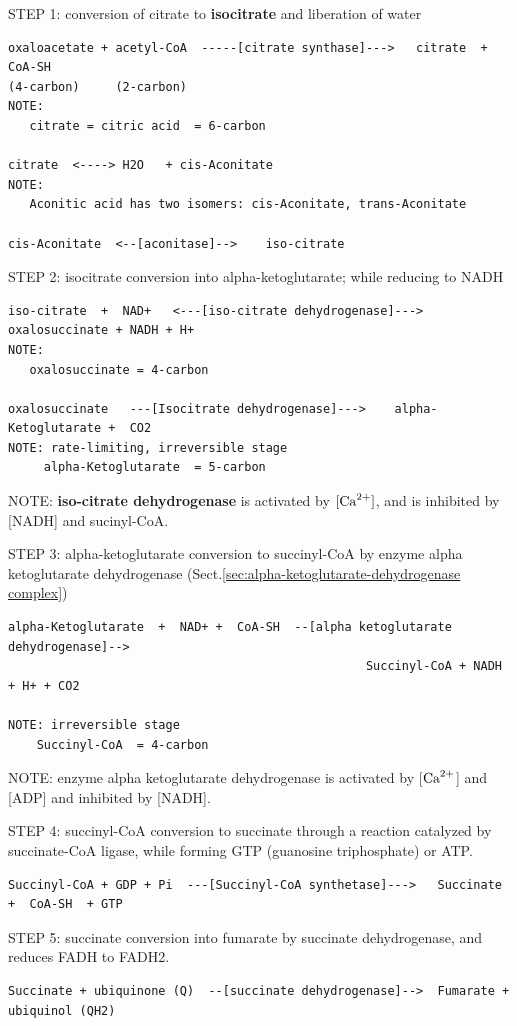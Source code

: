 STEP 1: conversion of citrate to {\bf isocitrate} and liberation of water
{\tiny
\begin{verbatim}
oxaloacetate + acetyl-CoA  -----[citrate synthase]--->   citrate  + CoA-SH
(4-carbon)     (2-carbon)
NOTE:
   citrate = citric acid  = 6-carbon

citrate  <----> H2O   + cis-Aconitate
NOTE:
   Aconitic acid has two isomers: cis-Aconitate, trans-Aconitate

cis-Aconitate  <--[aconitase]-->    iso-citrate
\end{verbatim}
}

\label{sec:alpha-ketoglutarate}
STEP 2: isocitrate conversion into alpha-ketoglutarate; while reducing
 to NADH
{\tiny
\begin{verbatim}
iso-citrate  +  NAD+   <---[iso-citrate dehydrogenase]--->    oxalosuccinate + NADH + H+
NOTE:
   oxalosuccinate = 4-carbon

oxalosuccinate   ---[Isocitrate dehydrogenase]--->    alpha-Ketoglutarate +  CO2
NOTE: rate-limiting, irreversible stage
     alpha-Ketoglutarate  = 5-carbon
\end{verbatim}
}
NOTE: {\bf iso-citrate dehydrogenase} is activated by $[{\text{Ca}^{2+}}]$, and is inhibited
by [NADH] and sucinyl-CoA.

STEP 3: alpha-ketoglutarate conversion to succinyl-CoA by enzyme alpha
ketoglutarate dehydrogenase (Sect.\ref{sec:alpha-ketoglutarate-dehydrogenase complex})
{\tiny
\begin{verbatim}
alpha-Ketoglutarate  +  NAD+ +  CoA-SH  --[alpha ketoglutarate dehydrogenase]-->
                                                  Succinyl-CoA + NADH + H+ + CO2

NOTE: irreversible stage
    Succinyl-CoA  = 4-carbon
\end{verbatim}
}
NOTE: enzyme alpha ketoglutarate dehydrogenase is activated by [${\text{Ca}^{2+}}$] and
[ADP] and inhibited by [NADH].

STEP 4: succinyl-CoA conversion to succinate through a reaction catalyzed by
succinate-CoA ligase, while forming GTP (guanosine triphosphate) or ATP.

{\tiny
\begin{verbatim}
Succinyl-CoA + GDP + Pi  ---[Succinyl-CoA synthetase]--->   Succinate +  CoA-SH  + GTP
\end{verbatim}
}


STEP 5: succinate conversion into fumarate by succinate dehydrogenase, and
reduces FADH to FADH2.

{\tiny
\begin{verbatim}
Succinate + ubiquinone (Q)  --[succinate dehydrogenase]-->  Fumarate + ubiquinol (QH2)
\end{verbatim}
}

